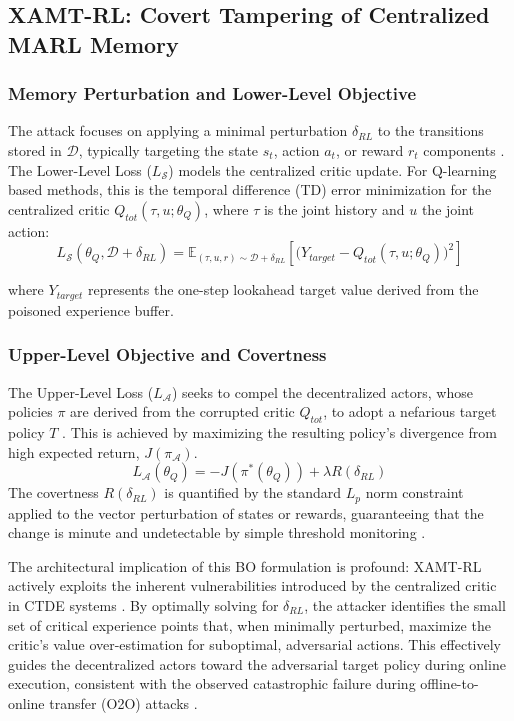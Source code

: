 \documentclass[conference]{IEEEtran}
\begin{document}
\subsection{XAMT-RL: Covert Tampering of Centralized MARL Memory}

\subsubsection{Memory Perturbation and Lower-Level Objective}
The attack focuses on applying a minimal perturbation $\delta_{RL}$ to the transitions stored in $\mathcal{D}$, typically targeting the state $s_t$, action $a_t$, or reward $r_t$ components \cite{Ref12, Ref13}. The Lower-Level Loss ($L_{\mathcal{S}}$) models the centralized critic update. For Q-learning based methods, this is the temporal difference (TD) error minimization for the centralized critic $Q_{tot}(\tau, u; \theta_Q)$, where $\tau$ is the joint history and $u$ the joint action:
\sloppy
$$
L_{\mathcal{S}}(\theta_Q, \mathcal{D}+\delta_{RL}) =
\mathbb{E}_{(\tau, u, r) \sim \mathcal{D}+\delta_{RL}}
\!\left[\!
\big(Y_{target} - Q_{tot}(\tau, u; \theta_Q)\big)^2
\!\right]\!
$$
\fussy

where $Y_{target}$ represents the one-step lookahead target value derived from the poisoned experience buffer.

\subsubsection{Upper-Level Objective and Covertness}
The Upper-Level Loss ($L_{\mathcal{A}}$) seeks to compel the decentralized actors, whose policies $\pi$ are derived from the corrupted critic $Q_{tot}$, to adopt a nefarious target policy $T$ \cite{Ref41}. This is achieved by maximizing the resulting policy's divergence from high expected return, $J(\pi_{\mathcal{A}})$.
$$L_{\mathcal{A}}(\theta_Q) = - J(\pi^*(\theta_Q)) + \lambda R(\delta_{RL})$$
The covertness $R(\delta_{RL})$ is quantified by the standard $L_p$ norm constraint applied to the vector perturbation of states or rewards, guaranteeing that the change is minute and undetectable by simple threshold monitoring \cite{Ref24}.

The architectural implication of this BO formulation is profound: XAMT-RL actively exploits the inherent vulnerabilities introduced by the centralized critic in CTDE systems \cite{Ref6}. By optimally solving for $\delta_{RL}$, the attacker identifies the small set of critical experience points that, when minimally perturbed, maximize the critic's value over-estimation for suboptimal, adversarial actions. This effectively guides the decentralized actors toward the adversarial target policy during online execution, consistent with the observed catastrophic failure during offline-to-online transfer (O2O) attacks \cite{Ref25}.
\end{document}
